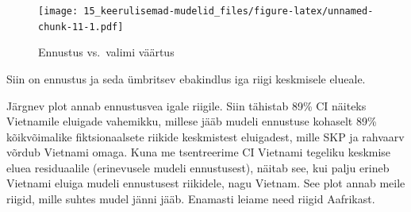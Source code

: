\documentclass[]{book}
\begin{document}
\begin{figure}
\centering
\texttt{[image: 15\_keerulisemad-mudelid\_files/figure-latex/unnamed-chunk-11-1.pdf]}
\caption{\label{fig:unnamed-chunk-11}Ennustus vs.~valimi väärtus}
\end{figure}

Siin on ennustus ja seda ümbritsev ebakindlus iga riigi keskmisele elueale.

Järgnev plot annab ennustusvea igale riigile. Siin tähistab 89\% CI näiteks Vietnamile eluigade vahemikku, millese jääb mudeli ennustuse kohaselt 89\% kõikvõimalike fiktsionaalsete riikide keskmistest eluigadest, mille SKP ja rahvaarv võrdub Vietnami omaga. Kuna me tsentreerime CI Vietnami tegeliku keskmise eluea residuaalile (erinevusele mudeli ennustusest), näitab see, kui palju erineb Vietnami eluiga mudeli ennustusest riikidele, nagu Vietnam. See plot annab meile riigid, mille suhtes mudel jänni jääb. Enamasti leiame need riigid Aafrikast.
\end{document}
